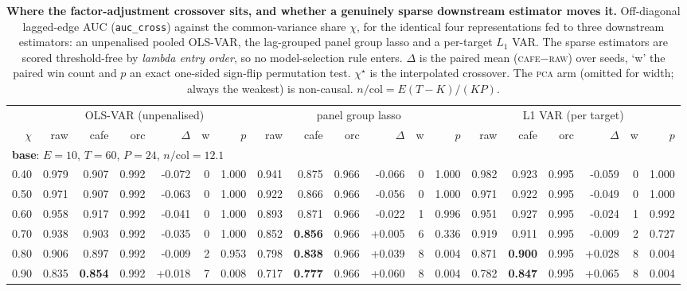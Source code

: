 \begin{table}[t]\centering\small
\setlength{\tabcolsep}{3.4pt}
\caption{\textbf{Where the factor-adjustment crossover sits, and whether a genuinely sparse downstream estimator moves it.} Off-diagonal lagged-edge AUC (\texttt{auc\_cross}) against the common-variance share $\chi$, for the identical four representations fed to three downstream estimators: an unpenalised pooled OLS-VAR, the lag-grouped panel group lasso and a per-target $L_1$ VAR. The sparse estimators are scored threshold-free by \emph{lambda entry order}, so no model-selection rule enters. $\Delta$ is the paired mean (\textsc{cafe}$-$\textsc{raw}) over seeds, `w' the paired win count and $p$ an exact one-sided sign-flip permutation test. $\chi^\star$ is the interpolated crossover. The \textsc{pca} arm (omitted for width; always the weakest) is non-causal. $n/\mathrm{col}=E(T-K)/(KP)$.}
\label{tab:causalsparsegate}
\begin{tabular}{r|rrrr@{\ }r@{\ }r|rrrr@{\ }r@{\ }r|rrrr@{\ }r@{\ }r}
\toprule
 & \multicolumn{6}{c}{OLS-VAR (unpenalised)} & \multicolumn{6}{c}{panel group lasso} & \multicolumn{6}{c}{L1 VAR (per target)} \\
$\chi$ & raw & cafe & orc & $\Delta$ & w & $p$ & raw & cafe & orc & $\Delta$ & w & $p$ & raw & cafe & orc & $\Delta$ & w & $p$ \\
\midrule
\multicolumn{19}{l}{\textbf{base}: $E{=}10$, $T{=}60$, $P{=}24$, $n/\mathrm{col}{=}12.1$} \\
0.40 & 0.979 & 0.907 & 0.992 & -0.072 & 0 & 1.000 & 0.941 & 0.875 & 0.966 & -0.066 & 0 & 1.000 & 0.982 & 0.923 & 0.995 & -0.059 & 0 & 1.000 \\
0.50 & 0.971 & 0.907 & 0.992 & -0.063 & 0 & 1.000 & 0.922 & 0.866 & 0.966 & -0.056 & 0 & 1.000 & 0.971 & 0.922 & 0.995 & -0.049 & 0 & 1.000 \\
0.60 & 0.958 & 0.917 & 0.992 & -0.041 & 0 & 1.000 & 0.893 & 0.871 & 0.966 & -0.022 & 1 & 0.996 & 0.951 & 0.927 & 0.995 & -0.024 & 1 & 0.992 \\
0.70 & 0.938 & 0.903 & 0.992 & -0.035 & 0 & 1.000 & 0.852 & \textbf{0.856} & 0.966 & +0.005 & 6 & 0.336 & 0.919 & 0.911 & 0.995 & -0.009 & 2 & 0.727 \\
0.80 & 0.906 & 0.897 & 0.992 & -0.009 & 2 & 0.953 & 0.798 & \textbf{0.838} & 0.966 & +0.039 & 8 & 0.004 & 0.871 & \textbf{0.900} & 0.995 & +0.028 & 8 & 0.004 \\
0.90 & 0.835 & \textbf{0.854} & 0.992 & +0.018 & 7 & 0.008 & 0.717 & \textbf{0.777} & 0.966 & +0.060 & 8 & 0.004 & 0.782 & \textbf{0.847} & 0.995 & +0.065 & 8 & 0.004 \\

\end{tabular}
\end{table}
